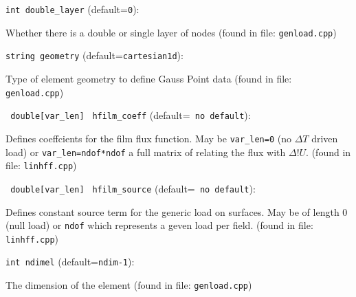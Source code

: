 \item\verb+int double_layer+ {\rm(default=\verb|0|)}:

Whether there is a double or single layer of nodes
 (found in file: \verb+genload.cpp+)
\item\verb+string geometry+ {\rm(default=\verb|cartesian1d|)}:

Type of element geometry to define Gauss Point data
 (found in file: \verb+genload.cpp+)
\item\verb+ double[var_len]+ \verb+ hfilm_coeff+ {\rm(default=\verb| no default|)}:
 
Defines coeffcients for the film flux function. May be 
\verb+var_len=0+ (no $\Delta T$ driven load) or
\verb+var_len=ndof*ndof+ a full matrix of relating the flux with
$\Delta !U$. 
  (found in file: \verb+linhff.cpp+)
\item\verb+ double[var_len]+ \verb+ hfilm_source+ {\rm(default=\verb| no default|)}:
 
Defines constant source term for the generic load on
surfaces. May be of length 0 (null load) or \verb+ndof+
which represents a geven load per field. 
  (found in file: \verb+linhff.cpp+)
\item\verb+int ndimel+ {\rm(default=\verb|ndim-1|)}:

The dimension of the element 
 (found in file: \verb+genload.cpp+)
